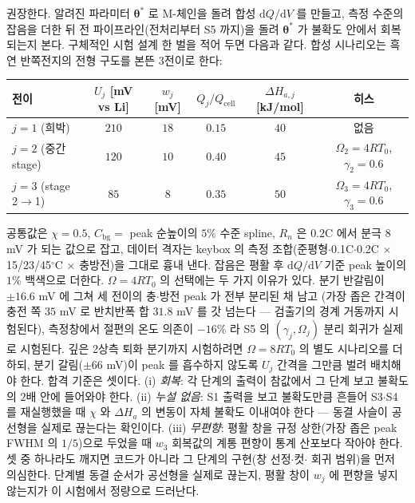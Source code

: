 \documentclass[11pt,a4paper]{article}
\newcommand{\dd}{\mathrm{d}}
\newcommand{\cell}{\mathrm{cell}}
\newcommand{\bg}{\mathrm{bg}}
\begin{document}
권장한다. 알려진 파라미터 $\bm\theta^\ast$ 로 M-체인을 돌려 합성 $\dd Q/\dd V$ 를 만들고, 측정 수준의
잡음을 더한 뒤 전 파이프라인(전처리부터 S5 까지)을 돌려 $\bm\theta^\ast$ 가 불확도 안에서 회복되는지 본다.
구체적인 시험 설계 한 벌을 적어 두면 다음과 같다. 합성 시나리오는 흑연 반쪽전지의 전형 구도를 본뜬 3전이로
한다:
\begin{center}
\renewcommand{\arraystretch}{1.25}
\begin{tabular}{lccccc}
\toprule
전이 & $U_j$ [mV vs Li] & $w_j$ [mV] & $Q_j/Q_\cell$ & $\Delta H_{a,j}$ [kJ/mol] & 히스 \\
\midrule
$j=1$ (희박) & $210$ & $18$ & $0.15$ & $40$ & 없음 \\
$j=2$ (중간 stage) & $120$ & $10$ & $0.40$ & $45$ & $\Omega_2=4RT_0$, $\gamma_2=0.6$ \\
$j=3$ (stage 2$\to$1) & $85$ & $8$ & $0.35$ & $50$ & $\Omega_3=4RT_0$, $\gamma_3=0.6$ \\
\bottomrule
\end{tabular}
\end{center}
공통값은 $\chi=0.5$, $C_\bg=$ peak 순높이의 $5\%$ 수준 spline, $R_n$ 은 $0.2$C 에서 분극 $8$ mV 가 되는
값으로 잡고, 데이터 격자는 keybox 의 측정 조합(준평형$\cdot$0.1C$\cdot$0.2C $\times$ 15/23/45$^\circ$C
$\times$ 충방전)을 그대로 흉내 낸다. 잡음은 평활 후 $\dd Q/\dd V$ 기준 peak 높이의 $1\%$ 백색으로 더한다. $\Omega=4RT_0$ 의 선택에는 두 가지
이유가 있다. 분기 반갈림이 $\pm16.6$ mV 에 그쳐 세 전이의 충$\cdot$방전 peak 가 전부 분리된 채 남고
(가장 좁은 간격이 충전 쪽 $35$ mV 로 반치반폭 합 $31.8$ mV 를 갓 넘는다 — 검출기의 경계 거동까지 시험된다),
측정창에서 절편의 온도 의존이 $-16\%$ 라 S5 의 $(\gamma_j,\Omega_j)$ 분리 회귀가 실제로 시험된다. 깊은
2상측 퇴화 분기까지 시험하려면 $\Omega=8RT_0$ 의 별도 시나리오를 더하되, 분기 갈림($\pm66$ mV)이 peak 를
흡수하지 않도록 $U_j$ 간격을 그만큼 벌려 배치해야 한다.
합격 기준은 셋이다. (i) \emph{회복}: 각 단계의 출력이 참값에서 그 단계 보고 불확도의 $2$배 안에 들어와야
한다. (ii) \emph{누설 없음}: S1 출력을 보고 불확도만큼 흔들어 S3$\cdot$S4 를 재실행했을 때 $\chi$ 와
$\Delta H_a$ 의 변동이 자체 불확도 이내여야 한다 — 동결 사슬이 공선형을 실제로 끊는다는 확인이다.
(iii) \emph{무편향}: 평활 창을 규정 상한(가장 좁은 peak FWHM 의 $1/5$)으로 두었을 때 $w_3$ 회복값의 계통
편향이 통계 산포보다 작아야 한다. 셋 중 하나라도 깨지면 코드가 아니라 그 단계의 구현(창 선정$\cdot$컷$\cdot$
회귀 범위)을 먼저 의심한다.
단계별 동결 순서가 공선형을 실제로 끊는지, 평활 창이 $w_j$ 에 편향을 넣지 않는지가 이 시험에서 정량으로
드러난다.
\end{document}
